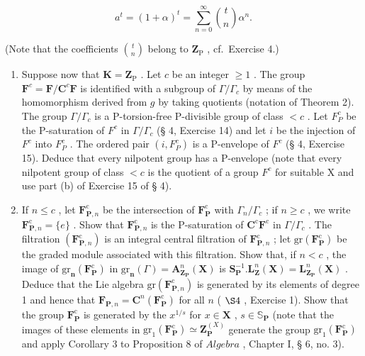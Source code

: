 \[
a ^ {t} = (1 + \alpha) ^ {t} = \sum_ {n = 0} ^ {\infty} \binom {t} {n} \alpha^ {n}.
\]

(Note that the coefficients \(\binom{t}{n}\) belong to \(\mathbf{Z}_{\mathrm{P}}\) , cf.~Exercise 4.)

\begin{enumerate}
\def\labelenumi{(\alph{enumi})}
\setcounter{enumi}{1}
\item
  Suppose now that \(\mathbf{K} = \mathbf{Z}_{\mathrm{P}}\) . Let \(c\) be an integer \(\geqslant 1\) . The group \(\mathbf{F}^c = \mathbf{F} / \mathbf{C}^c\mathbf{F}\) is identified with a subgroup of \(\Gamma /\Gamma_c\) by means of the homomorphism derived from \(g\) by taking quotients (notation of Theorem 2). The group \(\Gamma / \Gamma_c\) is a P-torsion-free P-divisible group of class \(< c\) . Let \(F_P^c\) be the P-saturation of \(F^c\) in \(\Gamma / \Gamma_c\) (§ 4, Exercise 14) and let \(i\) be the injection of \(F^c\) into \(F_P^c\) . The ordered pair \((i, F_P^c)\) is a P-envelope of \(F^c\) (§ 4, Exercise 15). Deduce that every nilpotent group has a P-envelope (note that every nilpotent group of class \(< c\) is the quotient of a group \(F^c\) for suitable X and use part (b) of Exercise 15 of § 4).
\item
  If \(n \leqslant c\) , let \(\mathbf{F}_{\mathbf{P},n}^{\mathrm{c}}\) be the intersection of \(\mathbf{F}_{\mathbf{P}}^{\mathrm{c}}\) with \(\Gamma_{n}/\Gamma_{c}\) ; if \(n \geqslant c\) , we write \(\mathbf{F}_{\mathbf{P},n}^{\mathrm{c}} = \{e\}\) . Show that \(\mathbf{F}_{\mathbf{P},n}^{\mathrm{c}}\) is the P-saturation of \(\mathbf{C}^{\mathrm{c}}\mathbf{F}^{\mathrm{c}}\) in \(\Gamma/\Gamma_{c}\) . The filtration \((\mathbf{F}_{\mathbf{P},n}^{\mathrm{c}})\) is an integral central filtration of \(\mathbf{F}_{\mathbf{P},n}^{\mathrm{c}}\) ; let \(\text{gr}(\mathbf{F}_{\mathbf{P}}^{\mathrm{c}})\) be the graded module associated with this filtration. Show that, if \(n < c\) , the image of \(\text{gr}_{\mathbf{n}}(\mathbf{F}_{\mathbf{P}}^{\mathrm{c}})\) in \(\text{gr}_{\mathbf{n}}(\Gamma) = \mathbf{A}_{\mathbf{Z}_{\mathbf{P}}}^{n}(\mathbf{X})\) is \(\mathbf{S}_{\mathbf{P}}^{-1}. \mathbf{L}_{\mathbf{Z}}^{n}(\mathbf{X}) = \mathbf{L}_{\mathbf{Z}_{\mathbf{P}}}^{n}(\mathbf{X})\) . Deduce that the Lie algebra \(\text{gr}(\mathbf{F}_{\mathbf{P},n}^{\mathrm{c}})\) is generated by its elements of degree 1 and hence that \(\mathbf{F}_{\mathbf{P},n} = \mathbf{C}^{n}(\mathbf{F}_{\mathbf{P}}^{\mathrm{c}})\) for all \(n\) ( \(\S 4\) , Exercise 1). Show that the group \(\mathbf{F}_{\mathbf{P}}^{\mathrm{c}}\) is generated by the \(x^{1/s}\) for \(x \in \mathbf{X}\) , \(s \in \mathbb{S}_{\mathbf{P}}\) (note that the images of these elements in \(\text{gr}_1(\mathbf{F}_{\mathbf{P}}^{\mathrm{c}}) \simeq \mathbf{Z}_{\mathbf{P}}^{(X)}\) generate the group \(\text{gr}_1(\mathbf{F}_{\mathbf{P}}^{\mathrm{c}})\) and apply Corollary 3 to Proposition 8 of \(Algebra\) , Chapter I, § 6, no. 3).

\end{enumerate}

